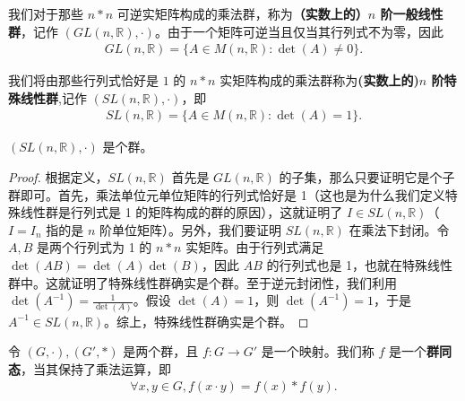 \documentclass[../../main.tex]{subfiles}
\begin{document}
\begin{definition}[一般线性群]
我们对于那些 $n*n$ 可逆实矩阵构成的乘法群，称为\textbf{（实数上的）$n$ 阶一般线性群}，记作 $(GL(n, \mathbb{R}), \cdot)$。由于一个矩阵可逆当且仅当其行列式不为零，因此
\begin{align*}
GL(n, \mathbb{R}) = \{A \in M(n, \mathbb{R}) : \det(A) \neq 0\}.
\end{align*} 
\end{definition}

\begin{definition}[特殊线性群]
我们将由那些行列式恰好是 $1$ 的 $n*n$ 实矩阵构成的乘法群称为\textbf{(实数上的)$n$ 阶特殊线性群},记作 $(SL(n, \mathbb{R}), \cdot)$，即
\begin{align*}
SL(n, \mathbb{R}) = \{A \in M(n, \mathbb{R}) : \det(A) = 1\}.
\end{align*} 
\end{definition}

\begin{proposition}
$(SL(n, \mathbb{R}), \cdot)$ 是个群。
\end{proposition}
\begin{proof}
根据定义，$SL(n, \mathbb{R})$ 首先是 $GL(n, \mathbb{R})$ 的子集，那么只要证明它是个子群即可。首先，乘法单位元单位矩阵的行列式恰好是 1（这也是为什么我们定义特殊线性群是行列式是 1 的矩阵构成的群的原因），这就证明了 $I \in SL(n, \mathbb{R})$（$I = I_n$ 指的是 $n$ 阶单位矩阵）。另外，我们要证明 $SL(n, \mathbb{R})$ 在乘法下封闭。令 $A, B$ 是两个行列式为 1 的 $n*n$ 实矩阵。由于行列式满足 $\det(AB) = \det(A)\det(B)$，因此 $AB$ 的行列式也是 1，也就在特殊线性群中。这就证明了特殊线性群确实是个群。至于逆元封闭性，我们利用 $\det(A^{-1}) = \frac{1}{\det(A)}$。假设 $\det(A) = 1$，则 $\det(A^{-1}) = 1$，于是 $A^{-1} \in SL(n, \mathbb{R})$。综上，特殊线性群确实是个群。 
\end{proof}

\begin{definition}[群同态]
令 $(G, \cdot), (G', *)$ 是两个群，且 $f : G \to G'$ 是一个映射。我们称 $f$ 是一个\textbf{群同态}，当其保持了乘法运算，即
\begin{align*}
\forall x, y \in G, f(x \cdot y) = f(x) * f(y).
\end{align*} 
\end{definition}
\end{document}
